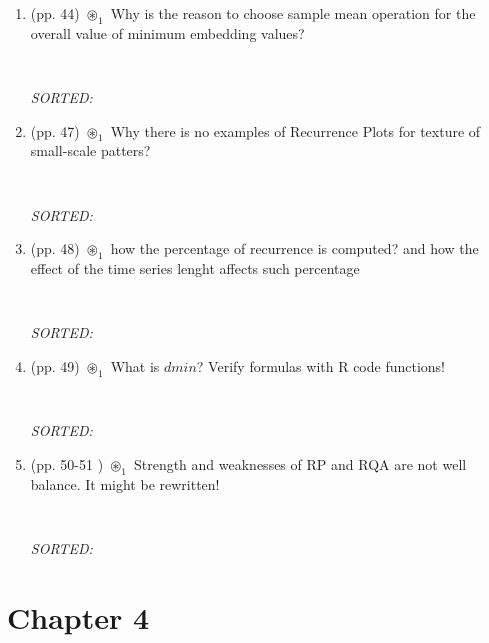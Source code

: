 \documentclass[12pt]{article}
\begin{document}
\begin{enumerate}
\item  (pp. 44) $\circledast_1$ 
	Why is the reason to choose sample mean operation
	for the overall value of minimum embedding values?
	\begin{verbatim}
	
	\end{verbatim}
	\textit{
	SORTED:  
	}
	\\


\item  (pp. 47) $\circledast_1$ 
	Why there is no examples of Recurrence Plots
	for texture of small-scale patters?
	\begin{verbatim}
	
	\end{verbatim}
	\textit{
	SORTED:  
	}
	\\


\item  (pp. 48) $\circledast_1$ 
	how the percentage of recurrence is computed?
	and how the effect of the time series lenght affects 
	such percentage
	\begin{verbatim}
	
	\end{verbatim}
	\textit{
	SORTED:  
	}
	\\



\item  (pp. 49) $\circledast_1$ 
	What is $dmin$?
	Verify formulas with R code functions!
	\begin{verbatim}
	
	\end{verbatim}
	\textit{
	SORTED:  
	}
	\\




\item  (pp. 50-51 ) $\circledast_1$ 
	Strength and weaknesses of RP and RQA
	are not well balance. It might be rewritten!
	\begin{verbatim}
	
	\end{verbatim}
	\textit{
	SORTED:  
	}
	\\







\end{enumerate}





\section{Chapter 4}
\end{document}
